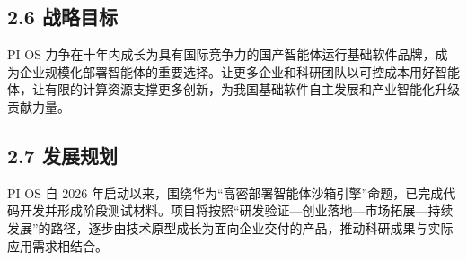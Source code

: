 \subsection{2.6 战略目标}\label{ux6218ux7565ux76eeux6807}

PI OS 力争在十年内成长为具有国际竞争力的国产智能体运行基础软件品牌，成为企业规模化部署智能体的重要选择。让更多企业和科研团队以可控成本用好智能体，让有限的计算资源支撑更多创新，为我国基础软件自主发展和产业智能化升级贡献力量。

\subsection{2.7 发展规划}\label{ux53d1ux5c55ux89c4ux5212}

PI OS 自 2026 年启动以来，围绕华为``高密部署智能体沙箱引擎''命题，已完成代码开发并形成阶段测试材料。项目将按照``研发验证---创业落地---市场拓展---持续发展''的路径，逐步由技术原型成长为面向企业交付的产品，推动科研成果与实际应用需求相结合。

